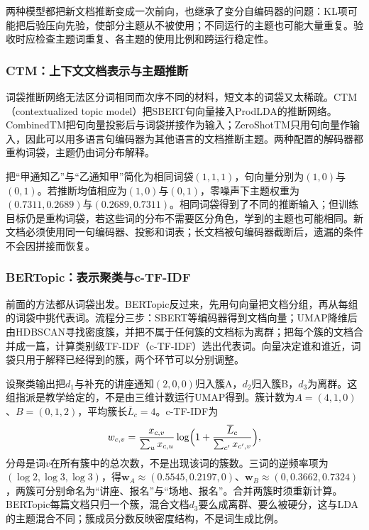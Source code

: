 两种模型都把新文档推断变成一次前向，也继承了变分自编码器的问题：KL项可能把后验压向先验，使部分主题从不被使用；不同运行的主题也可能大量重复。验收时应检查主题词重复、各主题的使用比例和跨运行稳定性。

\subsubsection{CTM：上下文文档表示与主题推断}
\label{sec:nlp-classification-ctm}

词袋推断网络无法区分词相同而次序不同的材料，短文本的词袋又太稀疏。CTM（contextualized topic model）把SBERT句向量接入ProdLDA的推断网络。CombinedTM把句向量投影后与词袋拼接作为输入\cite{nlp-intro-bianchi2021}；ZeroShotTM只用句向量作输入，因此可以用多语言句编码器为其他语言的文档推断主题。两种配置的解码器都重构词袋，主题仍由词分布解释。

把“甲通知乙”与“乙通知甲”简化为相同词袋$(1,1,1)$，句向量分别为$(1,0)$与$(0,1)$。若推断均值相应为$(1,0)$与$(0,1)$，零噪声下主题权重为$(0.7311,0.2689)$与$(0.2689,0.7311)$。相同词袋得到了不同的推断输入；但训练目标仍是重构词袋，若这些词的分布不需要区分角色，学到的主题也可能相同。新文档必须使用同一句编码器、投影和词表；长文档被句编码器截断后，遗漏的条件不会因拼接而恢复。

\subsubsection{BERTopic：表示聚类与c-TF-IDF}
\label{sec:nlp-classification-bertopic}

前面的方法都从词袋出发。BERTopic反过来，先用句向量把文档分组，再从每组的词袋中挑代表词。流程分三步：SBERT等编码器得到文档向量；UMAP降维后由HDBSCAN寻找密度簇，并把不属于任何簇的文档标为离群；把每个簇的文档合并成一篇，计算类别级TF-IDF（c-TF-IDF）选出代表词。向量决定谁和谁近，词袋只用于解释已经得到的簇，两个环节可以分别调整。

设聚类输出把$d_1$与补充的讲座通知$(2,0,0)$归入簇A，$d_2$归入簇B，$d_3$为离群。这组指派是教学给定的，不是由三维计数运行UMAP得到。簇计数为$A=(4,1,0)$、$B=(0,1,2)$，平均簇长$\overline L_c=4$。c-TF-IDF为
\[
 w_{c,v}=\frac{x_{c,v}}{\sum_ux_{c,u}}\log\Bigl(1+\frac{\overline L_c}{\sum_{c'}x_{c',v}}\Bigr),
\]
分母是词$v$在所有簇中的总次数，不是出现该词的簇数。三词的逆频率项为$(\log2,\log3,\log3)$，得$\bm w_A\approx(0.5545,0.2197,0)$、$\bm w_B\approx(0,0.3662,0.7324)$，两簇可分别命名为“讲座、报名”与“场地、报名”。合并两簇时须重新计算。BERTopic每篇文档只归一个簇，混合文档$d_3$要么成离群、要么被硬分，这与LDA的主题混合不同；簇成员分数反映密度结构，不是词生成比例。


